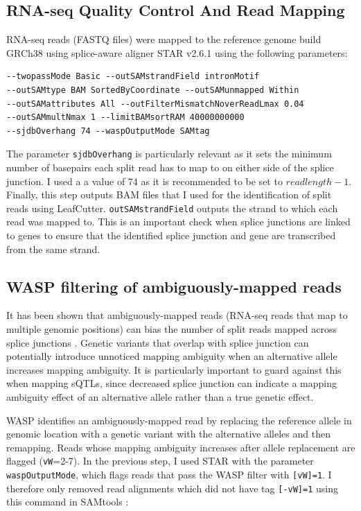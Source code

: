 \subsection{RNA-seq Quality Control And Read Mapping}
RNA-seq reads (FASTQ files) were mapped to the reference genome build GRCh38 using splice-aware aligner STAR v2.6.1 \cite{Dobin2013-hs} using the following parameters: 

\begin{verbatim}
--twopassMode Basic --outSAMstrandField intronMotif
--outSAMtype BAM SortedByCoordinate --outSAMunmapped Within
--outSAMattributes All --outFilterMismatchNoverReadLmax 0.04
--outSAMmultNmax 1 --limitBAMsortRAM 40000000000
--sjdbOverhang 74 --waspOutputMode SAMtag
\end{verbatim}
The parameter \Verb_sjdbOverhang_ is particularly relevant as it sets the minimum number of basepairs each split read has to map to on either side of the splice junction. I used a a value of 74 as it is recommended to be set to $read length -1$. Finally, this step outputs BAM files that I used for the identification of split reads using LeafCutter. \Verb_outSAMstrandField_ outputs the strand to which each read was mapped to. This is an important check when splice junctions are linked to genes to ensure that the identified splice junction and gene are transcribed from the same strand. 

\subsection{WASP filtering of ambiguously-mapped reads}
It has been shown that ambiguously-mapped reads (RNA-seq reads that map to multiple genomic positions) can bias the number of split reads mapped across splice junctions \cite{Van_de_Geijn2015-lb}. Genetic variants that overlap with splice junction can potentially introduce unnoticed mapping ambiguity when an alternative allele increases mapping ambiguity. It is particularly important to guard against this when mapping sQTLs, since decreased splice junction can indicate a mapping ambiguity effect of an alternative allele rather than a true genetic effect.

WASP \cite{Van_de_Geijn2015-lb} identifies an ambiguously-mapped read by replacing the reference allele in genomic location with a genetic variant with the alternative alleles and then remapping. Reads whose mapping ambiguity increases after allele replacement are flagged (\Verb_vW_=2-7). In the previous step, I used STAR with the parameter \Verb_waspOutputMode_, which flags reads that pass the WASP filter with \Verb_[vW]=1_.  I therefore only removed read alignments which did not have tag \Verb_[-vW]=1_ using this command in SAMtools \cite{Li2009-yk}:

